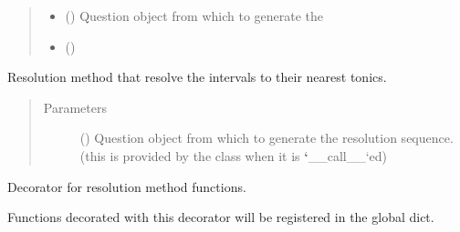 \documentclass[letterpaper,10pt,english]{sphinxmanual}
\begin{document}
\begin{fulllineitems}
\begin{fulllineitems}
\begin{quote}
\begin{description}
\begin{itemize}
\item {} 
 () \textendash{} Question object from which to generate the

\item {} 
 () \textendash{} 

\end{itemize}

\end{description}\end{quote}

\end{fulllineitems}


\end{fulllineitems}


\begin{fulllineitems}
\label{\detokenize{index:birdears.resolution.nearest_tonic}}
Resolution method that resolve the intervals to their nearest tonics.
\begin{quote}\begin{description}
\item[{Parameters}] \leavevmode
{} () \textendash{} Question object from which to generate the
resolution sequence. (this is provided by the  class
when it is {\color{red}\bfseries{}{}`}\_\_call\_\_{}`ed)

\end{description}\end{quote}

\end{fulllineitems}


\begin{fulllineitems}
\label{\detokenize{index:birdears.resolution.register_resolution_method}}
Decorator for resolution method functions.

Functions decorated with this decorator will be registered in the
 global dict.

\end{fulllineitems}
\end{document}

